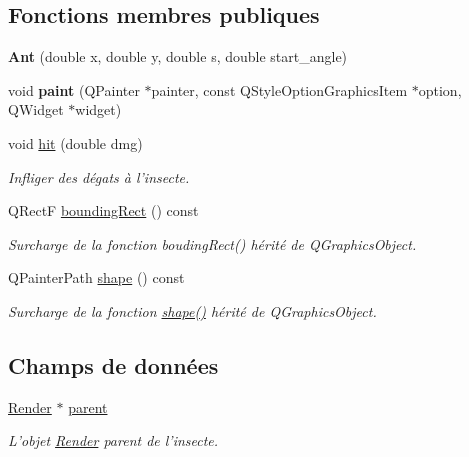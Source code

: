 \subsection*{Fonctions membres publiques}
\begin{DoxyCompactItemize}
\item 
\hypertarget{classAnt_a52f0aed092463606f4d4edd2091d92eb}{
{\bfseries Ant} (double x, double y, double s, double start\_\-angle)}
\label{classAnt_a52f0aed092463606f4d4edd2091d92eb}

\item 
\hypertarget{classAnt_abb2b56b817ce45d815251549a77402be}{
void {\bfseries paint} (QPainter $\ast$painter, const QStyleOptionGraphicsItem $\ast$option, QWidget $\ast$widget)}
\label{classAnt_abb2b56b817ce45d815251549a77402be}

\item 
void \hyperlink{classAnt_a64b0e0e7d2605c1a5a0906587ab70920}{hit} (double dmg)
\begin{DoxyCompactList}\small\item\em Infliger des dégats à l'insecte. \end{DoxyCompactList}\item 
QRectF \hyperlink{classBug_a9b39c25361faad07b1bf2dd927d09dab}{boundingRect} () const 
\begin{DoxyCompactList}\small\item\em Surcharge de la fonction boudingRect() hérité de QGraphicsObject. \end{DoxyCompactList}\item 
QPainterPath \hyperlink{classBug_a587a36d3145c2b4dba6c689af22c65ac}{shape} () const 
\begin{DoxyCompactList}\small\item\em Surcharge de la fonction \hyperlink{classBug_a587a36d3145c2b4dba6c689af22c65ac}{shape()} hérité de QGraphicsObject. \end{DoxyCompactList}\end{DoxyCompactItemize}
\subsection*{Champs de données}
\begin{DoxyCompactItemize}
\item 
\hyperlink{classRender}{Render} $\ast$ \hyperlink{classBug_a7a93aae4e4b7a215c94ff85d0bd6e26d}{parent}
\begin{DoxyCompactList}\small\item\em L'objet \hyperlink{classRender}{Render} parent de l'insecte. \end{DoxyCompactList}\end{DoxyCompactItemize}
